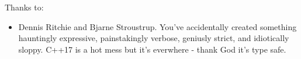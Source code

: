 \noindent
Thanks to:
\begin{itemize}
    \item Dennis Ritchie and Bjarne Stroustrup.  You've accidentally created something hauntingly expressive, painstakingly verbose, geniusly strict, and idiotically sloppy.  C++17 is a hot mess but it's everwhere - thank God it's type safe.  
\end{itemize}
